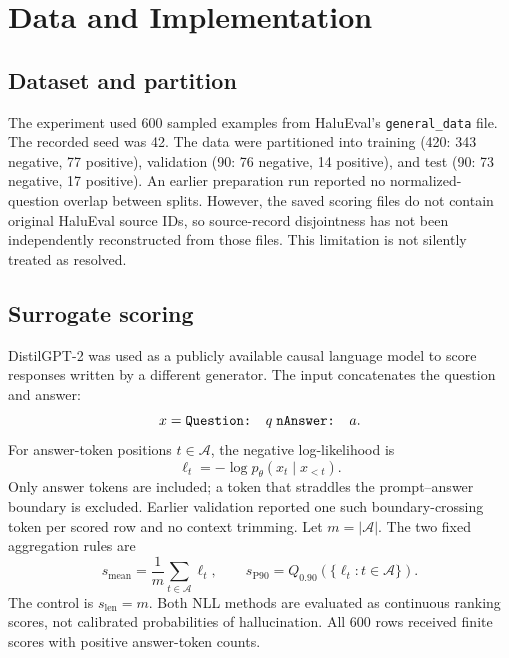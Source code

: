 \documentclass[manuscript,screen]{acmart}
\begin{document}
\section{Data and Implementation}
\subsection{Dataset and partition}
The experiment used 600 sampled examples from HaluEval's \texttt{general\_data} file. The recorded seed was 42. The data were partitioned into training (420: 343 negative, 77 positive), validation (90: 76 negative, 14 positive), and test (90: 73 negative, 17 positive). An earlier preparation run reported no normalized-question overlap between splits. However, the saved scoring files do not contain original HaluEval source IDs, so source-record disjointness has not been independently reconstructed from those files. This limitation is not silently treated as resolved.

\subsection{Surrogate scoring}
DistilGPT-2 was used as a publicly available causal language model to score responses written by a different generator. The input concatenates the question and answer:
\begin{equation}
 x=\texttt{Question: }q\;\texttt{\\nAnswer: }a.
\end{equation}
For answer-token positions $t\in\mathcal{A}$, the negative log-likelihood is
\begin{equation}
 \ell_t=-\log p_{\theta}(x_t\mid x_{<t}).\label{eq:nll}
\end{equation}
Only answer tokens are included; a token that straddles the prompt--answer boundary is excluded. Earlier validation reported one such boundary-crossing token per scored row and no context trimming. Let $m=|\mathcal{A}|$. The two fixed aggregation rules are
\begin{equation}
 s_{\mathrm{mean}}=\frac{1}{m}\sum_{t\in\mathcal{A}}\ell_t,\qquad
 s_{\mathrm{P90}}=Q_{0.90}(\{\ell_t:t\in\mathcal{A}\}).\label{eq:agg}
\end{equation}
The control is $s_{\mathrm{len}}=m$. Both NLL methods are evaluated as continuous ranking scores, not calibrated probabilities of hallucination. All 600 rows received finite scores with positive answer-token counts.
\end{document}

